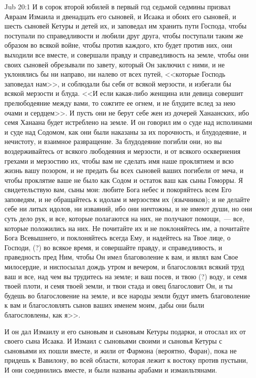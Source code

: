 \vs Jub 20:1
И в сорок второй юбилей в первый год седьмой
седмины призвал Авраам Измаила и двенадцать его
сыновей, и Исаака и обоих его сыновей, и шесть
сыновей Кетуры и детей их, и заповедал им хранить
пути Господа, чтобы поступали по справедливости
и любили друг друга, чтобы поступали таким же
образом во всякой войне, чтобы против каждого,
кто будет против них, они выходили все вместе, и
совершали правду и справедливость на земле,
чтобы они своих сыновей обрезывали по завету,
который Он заключил с ними, и не уклонялись бы ни
направо, ни налево от всех путей, <<которые
Господь заповедал нам>>, и соблюдали бы себя от
всякой мерзости, и избегали бы всякой мерзости и
блуда. <<И если какая-либо женщина или девица
совершит прелюбодеяние между вами, то сожгите ее
огнем, и не блудите вслед за нею очами и
сердцем>>. И пусть они не берут себе жен из
дочерей Ханаанских, ибо семя Ханаана будет
истреблено на земле. И он говорил им о суде над
исполинами и суде над Содомом, как они были
наказаны за их порочность, и блудодеяние, и
нечистоту, и взаимное развращение. За
блудодеяние погибли они, но вы воздерживайтесь
от всякого любодеяния и мерзости, и от всякого
осквернения грехами и мерзостию их, чтобы вам не
сделать имя наше проклятием и всю жизнь вашу позором,
и не предать бы всех сыновей ваших погибели
от меча, и чтобы проклятие ваше не было как Содом
и остаток ваш как сыны Гоморры. Я свидетельствую
вам, сыны мои: любите Бога небес и покоряйтесь
всем Его заповедям, и не обращайтесь к идолам и
мерзостям их (язычников); и не делайте себе ни
литых идолов, ни изваяний, ибо они ничтожны, и не
имеют души, но они суть дело рук, и все, которые
полагаются на них, не получают помощи,~--- все,
которые положились на них. Не почитайте их и не
поклоняйтесь им, а почитайте Бога Всевышнего, и
поклоняйтесь всегда Ему, и надейтесь на Твое
лице, о Господи, (?) во всякое время, и совершайте
правду, и справедливость, и праведность пред Ним,
чтобы Он имел благоволение к вам, и являл вам Свое
милосердие, и ниспосылал дождь утром и вечером, и
благословлял всякий труд ваш и все, над чем вы
трудитесь на земле; и ваш посев, и твою (?) воду, и
семя твоей плоти, и семя твоей земли, и твои стада
и овец благословит Он, и ты будешь во
благословение на земле, и все народы земли будут
иметь благоволение к вам и благословлять сынов
ваших именем моим, дабы они были благословлены,
как я>>.

И он дал Измаилу и его сыновьям и сыновьям
Кетуры подарки, и отослал их от своего сына
Исаака. И Измаил с сыновьями своими и сыновья
Кетуры с сыновьями их пошли вместе, и жили от
Фармона (вероятно, Фаран), пока не придешь к
Вавилону, во всей области, которая лежит к
востоку против пустыни, И они соединились вместе,
и были названы арабами и измаильтянами.

